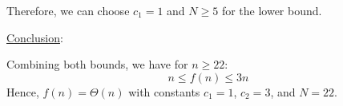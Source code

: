 \begin{prob}
\begin{soln}
        Therefore, we can choose \( c_1 = 1 \) and \( N \geq 5 \) for the lower bound.

        \vspace{1em}
        \underline{Conclusion}:

        Combining both bounds, we have for \( n \geq 22 \):
        \[
            n \leq f(n) \leq 3n
        \]
        Hence, \( f(n) = \Theta(n) \) with constants \( c_1 = 1 \), \( c_2 = 3 \), and \( N = 22 \).
    \end{soln}
    
\end{prob}
